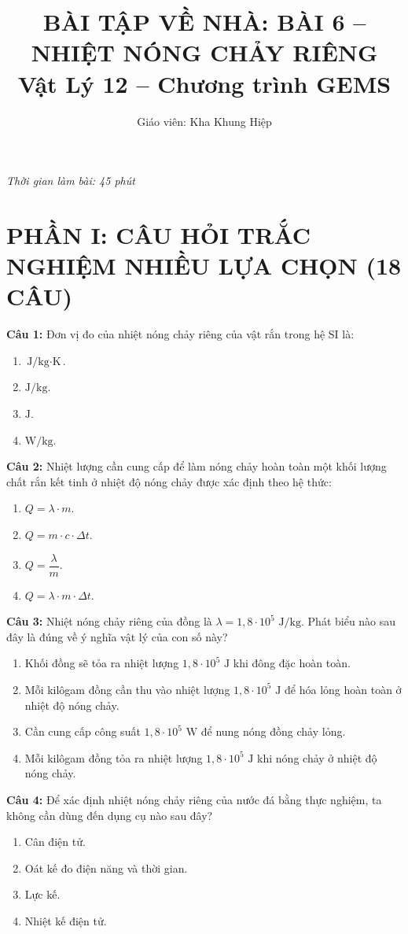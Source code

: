 \documentclass[12pt,a4paper]{article}
\title{\textbf{BÀI TẬP VỀ NHÀ: BÀI 6 -- NHIỆT NÓNG CHẢY RIÊNG}\\
\large Vật Lý 12 -- Chương trình GEMS}
\author{Giáo viên: Kha Khung Hiệp}
\date{}
\begin{document}
\maketitle
\textit{Thời gian làm bài: 45 phút}

\section*{PHẦN I: CÂU HỎI TRẮC NGHIỆM NHIỀU LỰA CHỌN (18 CÂU)}

\textbf{Câu 1:} Đơn vị đo của nhiệt nóng chảy riêng của vật rắn trong hệ SI là:
\begin{enumerate}[label=\Alph*.]
  \item $\text{J/kg} \cdot \text{K}$.
  \item $\text{J/kg}$.
  \item $\text{J}$.
  \item $\text{W/kg}$.
\end{enumerate}

\textbf{Câu 2:} Nhiệt lượng cần cung cấp để làm nóng chảy hoàn toàn một khối lượng chất rắn kết tinh ở nhiệt độ nóng chảy được xác định theo hệ thức:
\begin{enumerate}[label=\Alph*.]
  \item $Q = \lambda \cdot m$.
  \item $Q = m \cdot c \cdot \Delta t$.
  \item $Q = \dfrac{\lambda}{m}$.
  \item $Q = \lambda \cdot m \cdot \Delta t$.
\end{enumerate}

\textbf{Câu 3:} Nhiệt nóng chảy riêng của đồng là $\lambda = 1{,}8 \cdot 10^5\text{ J/kg}$. Phát biểu nào sau đây là đúng về ý nghĩa vật lý của con số này?
\begin{enumerate}[label=\Alph*.]
  \item Khối đồng sẽ tỏa ra nhiệt lượng $1{,}8 \cdot 10^5\text{ J}$ khi đông đặc hoàn toàn.
  \item Mỗi kilôgam đồng cần thu vào nhiệt lượng $1{,}8 \cdot 10^5\text{ J}$ để hóa lỏng hoàn toàn ở nhiệt độ nóng chảy.
  \item Cần cung cấp công suất $1{,}8 \cdot 10^5\text{ W}$ để nung nóng đồng chảy lỏng.
  \item Mỗi kilôgam đồng tỏa ra nhiệt lượng $1{,}8 \cdot 10^5\text{ J}$ khi nóng chảy ở nhiệt độ nóng chảy.
\end{enumerate}

\textbf{Câu 4:} Để xác định nhiệt nóng chảy riêng của nước đá bằng thực nghiệm, ta không cần dùng đến dụng cụ nào sau đây?
\begin{enumerate}[label=\Alph*.]
  \item Cân điện tử.
  \item Oát kế đo điện năng và thời gian.
  \item Lực kế.
  \item Nhiệt kế điện tử.
\end{enumerate}
\end{document}

